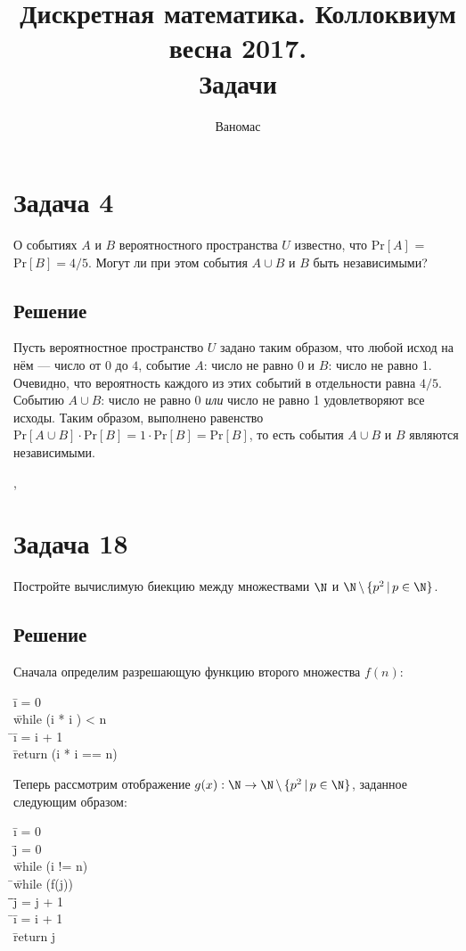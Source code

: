 \documentclass[a4paper,12pt]{article}
\newcommand {\gu} [1] {\guillemotleft#1\guillemotright}
\renewcommand{\Pr} {\text {Pr}}
\newcommand{\tab}{\quad\=}
\newenvironment{programm}{
    \ttfamily
    \smallskip
    \begin{tabbing}
    }
    {
    \end{tabbing}
    \smallskip
}
\begin{document}
	\title{Дискретная математика. Коллоквиум весна 2017. \\ Задачи}
	\author{Ваномас}
	\maketitle
	
	\section*{Задача 4}
	О событиях $A$ и $B$ вероятностного пространства $U$ известно, что $\Pr [A]$ = $\Pr [B] = 4/5$. Могут ли при этом события $A\cup B$ и $B$ быть независимыми?
	
	\subsection*{Решение}
	Пусть вероятностное пространство $U$ задано таким образом, что любой исход на нём --- число от $0$ до $4$, событие $A$: \gu{число не равно 0} и $B$: \gu{число не равно 1}. Очевидно, что вероятность каждого из этих событий в отдельности равна $4/5$. Событию $A\cup B$: \gu{число не равно 0 \textit{или} число не равно 1} удовлетворяют все исходы. Таким образом, выполнено равенство $\Pr [A\cup B]\cdot\Pr [B]=1\cdot\Pr [B] = \Pr[B]$, то есть события $A\cup B$ и $B$ являются независимыми.
	
	\sep
	\section*{Задача 18}
	Постройте вычислимую биекцию между множествами $\N$ и $\N\,\backslash\,\{p^2\,|\,p\in\N\}$.
	\subsection*{Решение}
	Сначала определим разрешающую функцию второго множества $f(n)$:
    \begin{programm}
    \tab i = 0\\
    \tab while (i * i ) < n\\
    \tab\tab i = i + 1\\
    \tab return (i * i == n)
    \end{programm}
    Теперь рассмотрим отображение $g(x): \N\to\N\,\backslash\,\{p^2\,|\,p\in\N\}$, заданное следующим образом:
	
    \begin{programm}
    \tab i = 0\\
    \tab j = 0\\
    \tab while (i != n)\\
    \tab\tab while (f(j))\\
    \tab\tab\tab j = j + 1\\
    \tab\tab i = i + 1\\
    \tab return j
    \end{programm}
	
\end{document}

